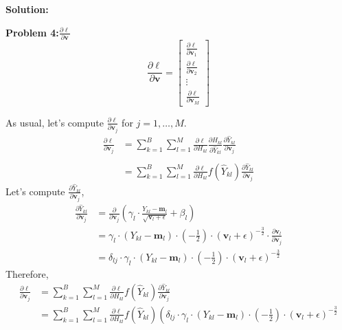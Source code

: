 \documentclass{article}
\newenvironment{solution}
  {\par\noindent\textbf{Solution:}\par}
  {\par}
\begin{document}
\begin{solution}
  \textbf{Problem 4:}$\frac{\partial \ell}{\partial \textbf{v}}$
  $$\frac{\partial \ell}{\partial \textbf{v}} = \begin{bmatrix} \frac{\partial\ell}{\partial\textbf{v}_1} \\ \frac{\partial\ell}{\partial\textbf{v}_2} \\ \vdots \\ \frac{\partial\ell}{\partial\textbf{v}_M} \end{bmatrix}$$

  As usual, let's compute $\frac{\partial\ell}{\partial\textbf{v}_j}$ for $j =1,\dots,M$.
\[ 
  \begin{aligned}
    \frac{\partial \ell}{\partial \textbf{v}_j} &= \sum_{k = 1}^{B} \sum_{l = 1}^{M} \frac{\partial \ell}{\partial H_{kl}}\frac{\partial H_{kl}}{\partial \hat{Y}_{kl}}\frac{\partial \hat{Y}_{kl}}{\partial \textbf{v}_j}  \\
                                             \\ &=\sum_{k = 1}^{B} \sum_{l = 1}^{M} \frac{\partial \ell}{\partial H_{kl}}f(\hat{Y}_{kl})\frac{\partial \hat{Y}_{kl}}{\partial \textbf{v}_j}
  \end{aligned}
  \]
 Let's compute $\frac{\partial \hat{Y}_{kl}}{\partial \textbf{v}_j}$,
  \[
    \begin{aligned}
       \frac{\partial \hat{Y}_{kl}}{\partial \textbf{v}_j} &= \frac{\partial}{\partial \textbf{v}_j}  \left( \gamma_l \cdot \frac{ Y_{kl} - \textbf{m}_l }{\sqrt{\textbf{v}_l + \epsilon}} + \beta_l \right) \\  
                                                           &= \gamma_l \cdot (Y_{kl}- \textbf{m}_l) \cdot (-\frac{1}{2}) \cdot (\textbf{v}_l + \epsilon)^{-\frac{3}{2}}\cdot \frac{\partial \textbf{v}_l}{\partial \textbf{v}_j} \\ 
                                                           &= \delta_{lj} \cdot \gamma_l \cdot (Y_{kl} - \textbf{m}_l) \cdot (-\frac{1}{2}) \cdot (\textbf{v}_l + \epsilon)^{-\frac{3}{2}}
     \end{aligned}
  \]
  Therefore,
      \[
      \begin{aligned}
        \frac{\partial \ell}{\partial \textbf{v}_j} &=\sum_{k = 1}^{B} \sum_{l = 1}^{M} \frac{\partial \ell}{\partial H_{kl}}f(\hat{Y}_{kl})\frac{\partial \hat{Y}_{kl}}{\partial \textbf{v}_j} \\ 
                                                    &= \sum_{k = 1}^{B} \sum_{l = 1}^{M} \frac{\partial \ell}{\partial H_{kl}}f(\hat{Y}_{kl})\left( \delta_{lj} \cdot \gamma_l \cdot (Y_{kl} - \textbf{m}_l) \cdot (-\frac{1}{2}) \cdot (\textbf{v}_l + \epsilon)^{-\frac{3}{2}}

\end{aligned}\]
\end{solution}
\end{document}
